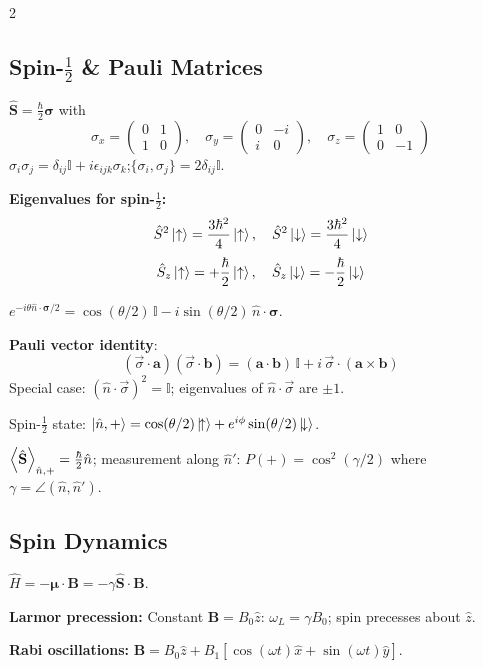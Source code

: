 \documentclass[9pt,a4paper]{article} %
\newcommand{\bs}[1]{\symbf{#1}}\usepackage{empheq}   %
\newcommand{\Hhat}{\hat{H}}
\newcommand{\Sop}{\hat{\mathbf{S}}}
\newcommand{\Id}{\mathbb{I}}
\begin{document}
\begin{multicols}{2}
\subsection{Spin-$\frac{1}{2}$ \& Pauli Matrices}
$\Sop=\frac{\hbar}{2}\bs{\sigma}$ with
\[
\sigma_x=\begin{pmatrix}0&1\\1&0\end{pmatrix},\quad
\sigma_y=\begin{pmatrix}0&-i\\i&0\end{pmatrix},\quad
\sigma_z=\begin{pmatrix}1&0\\0&-1\end{pmatrix}
\]
$\sigma_i\sigma_j=\delta_{ij}\Id+i\epsilon_{ijk}\sigma_k$;\quad $\{\sigma_i,\sigma_j\}=2\delta_{ij}\Id$.

\textbf{Eigenvalues for spin-$\frac{1}{2}$:}
\[
\hat{S}^2\ket{\uparrow}=\frac{3\hbar^2}{4}\ket{\uparrow},\quad \hat{S}^2\ket{\downarrow}=\frac{3\hbar^2}{4}\ket{\downarrow}
\]
\[
\hat{S}_z\ket{\uparrow}=+\frac{\hbar}{2}\ket{\uparrow},\quad \hat{S}_z\ket{\downarrow}=-\frac{\hbar}{2}\ket{\downarrow}
\]

$e^{-i\theta\hat{n}\cdot\bs{\sigma}/2}=\cos(\theta/2)\,\Id-i\sin(\theta/2)\,\hat{n}\cdot\bs{\sigma}$.

\textbf{Pauli vector identity}:
\[
\boxed{(\vec{\sigma}\cdot\mathbf{a})(\vec{\sigma}\cdot\mathbf{b})=(\mathbf{a}\cdot\mathbf{b})\,\Id+i\,\vec{\sigma}\cdot(\mathbf{a}\times\mathbf{b})}
\]
Special case: $(\hat{n}\cdot\vec{\sigma})^2=\Id$;\; eigenvalues of $\hat{n}\cdot\vec{\sigma}$ are $\pm 1$.

Spin-$\frac{1}{2}$ state: $\ket{\hat{n},+}=\cos(\theta/2)\ket{\!\uparrow}+e^{i\phi}\sin(\theta/2)\ket{\!\downarrow}$.

$\ev{\Sop}_{\hat{n},+}=\frac{\hbar}{2}\hat{n}$;\; measurement along $\hat{n}'$: $P(+)=\cos^2(\gamma/2)$ where $\gamma=\angle(\hat{n},\hat{n}')$.

\subsection{Spin Dynamics}
$\Hhat=-\bs{\mu}\cdot\mathbf{B}=-\gamma\Sop\cdot\mathbf{B}$.

\textbf{Larmor precession:} Constant $\mathbf{B}=B_0\hat{z}$: $\omega_L=\gamma B_0$; spin precesses about $\hat{z}$.

\textbf{Rabi oscillations:} $\mathbf{B}=B_0\hat{z}+B_1[\cos(\omega t)\hat{x}+\sin(\omega t)\hat{y}]$.


\end{multicols}
\end{document}
